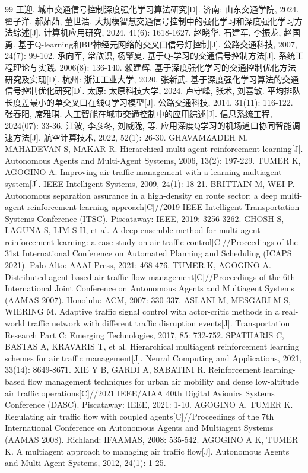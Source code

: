 \documentclass[12pt,a4paper,UTF8]{ctexart}
\begin{document}
\begin{thebibliography}{99}
 王迎. 城市交通信号控制深度强化学习算法研究[D]. 济南: 山东交通学院, 2024.
 翟子洋, 郝茹茹, 董世浩. 大规模智慧交通信号控制中的强化学习和深度强化学习方法综述[J]. 计算机应用研究, 2024, 41(6): 1618-1627.
 赵晓华, 石建军, 李振龙, 赵国勇. 基于Q-learning和BP神经元网络的交叉口信号灯控制[J]. 公路交通科技, 2007, 24(7): 99-102.
 承向军, 常歆识, 杨肇夏. 基于Q-学习的交通信号控制方法[J]. 系统工程理论与实践, 2006(8): 136-140.
 赖建辉. 基于深度强化学习的交通控制优化方法研究及实现[D]. 杭州: 浙江工业大学, 2020.
 张新武. 基于深度强化学习算法的交通信号控制优化研究[D]. 太原: 太原科技大学, 2024.
 卢守峰, 张术, 刘喜敏. 平均排队长度差最小的单交叉口在线Q学习模型[J]. 公路交通科技, 2014, 31(11): 116-122.
 张春阳, 席雅琪. 人工智能在城市交通控制中的应用综述[J]. 信息系统工程, 2024(07): 33-36.
 江波, 李彦冬, 刘威陇, 等. 应用深度Q学习的机场道口协同智能调速方法[J]. 航空计算技术, 2022, 52(1): 26-30.
 GHAVAMZADEH M, MAHADEVAN S, MAKAR R. Hierarchical multi-agent reinforcement learning[J]. Autonomous Agents and Multi-Agent Systems, 2006, 13(2): 197-229.
 TUMER K, AGOGINO A. Improving air traffic management with a learning multiagent system[J]. IEEE Intelligent Systems, 2009, 24(1): 18-21.
 BRITTAIN M, WEI P. Autonomous separation assurance in a high-density en route sector: a deep multi-agent reinforcement learning approach[C]//2019 IEEE Intelligent Transportation Systems Conference (ITSC). Piscataway: IEEE, 2019: 3256-3262.
 GHOSH S, LAGUNA S, LIM S H, et al. A deep ensemble method for multi-agent reinforcement learning: a case study on air traffic control[C]//Proceedings of the 31st International Conference on Automated Planning and Scheduling (ICAPS 2021). Palo Alto: AAAI Press, 2021: 468-476.
 TUMER K, AGOGINO A. Distributed agent-based air traffic flow management[C]//Proceedings of the 6th International Joint Conference on Autonomous Agents and Multiagent Systems (AAMAS 2007). Honolulu: ACM, 2007: 330-337.
 ASLANI M, MESGARI M S, WIERING M. Adaptive traffic signal control with actor-critic methods in a real-world traffic network with different traffic disruption events[J]. Transportation Research Part C: Emerging Technologies, 2017, 85: 732-752.
 SPATHARIS C, BASTAS A, KRAVARIS T, et al. Hierarchical multiagent reinforcement learning schemes for air traffic management[J]. Neural Computing and Applications, 2021, 33(14): 8649-8671.
 XIE Y B, GARDI A, SABATINI R. Reinforcement learning-based flow management techniques for urban air mobility and dense low-altitude air traffic operations[C]//2021 IEEE/AIAA 40th Digital Avionics Systems Conference (DASC). Piscataway: IEEE, 2021: 1-10.
 AGOGINO A, TUMER K. Regulating air traffic flow with coupled agents[C]//Proceedings of the 7th International Conference on Autonomous Agents and Multiagent Systems (AAMAS 2008). Richland: IFAAMAS, 2008: 535-542.
 AGOGINO A K, TUMER K. A multiagent approach to managing air traffic flow[J]. Autonomous Agents and Multi-Agent Systems, 2012, 24(1): 1-25.
\end{thebibliography}
\end{document}
